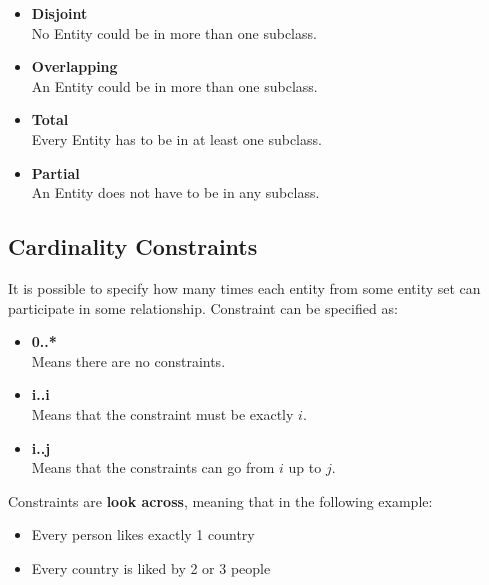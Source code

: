 \documentclass{article}
\begin{document}
\begin{itemize}
	\item \textbf{Disjoint}
	\vspace{.2cm} \\
	No Entity could be in more than one subclass.
	
	\item \textbf{Overlapping}
	\vspace{.2cm} \\
	An Entity could be in more than one subclass.
	
	\item \textbf{Total}
	\vspace{.2cm} \\
	Every Entity has to be in at least one subclass.
	
	\item \textbf{Partial}
	\vspace{.2cm} \\
	An Entity does not have to be in any subclass.
\end{itemize}

\subsection{Cardinality Constraints}
It is possible to specify how many times each entity from some entity set can participate in some relationship. Constraint can be specified as:

\begin{itemize}
	\item \textbf{0..*}
	\vspace{.2cm} \\
	Means there are no constraints.
	
	\item \textbf{i..i}
	\vspace{.2cm} \\
	Means that the constraint must be exactly $i$.
	
	\item \textbf{i..j}
	\vspace{.2cm} \\
	Means that the constraints can go from $i$ up to $j$.
\end{itemize}
Constraints are \textbf{look across}, meaning that in the following example:

\begin{itemize}
	\item Every person likes exactly 1 country
	\item Every country is liked by 2 or 3 people
\end{itemize}
\end{document}
